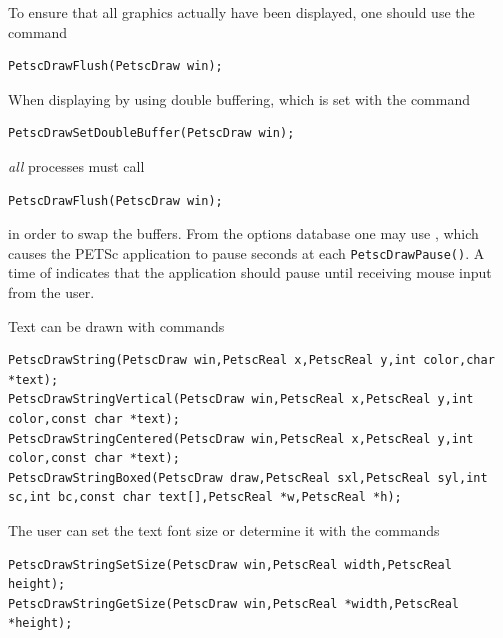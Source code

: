 {{{To ensure that all graphics actually have been displayed, one should use
 the
command
\begin{lstlisting}
PetscDrawFlush(PetscDraw win);
\end{lstlisting}
When displaying by using double buffering, which is set with the
command  
\begin{lstlisting}
PetscDrawSetDoubleBuffer(PetscDraw win);
\end{lstlisting}
{\em all} processes must call
\begin{lstlisting}
PetscDrawFlush(PetscDraw win);
\end{lstlisting}
in order to swap the buffers. From the options database one may use
 , which  causes the PETSc application
to pause  seconds at each \lstinline{PetscDrawPause()}. A time of 
indicates that the application should pause until receiving mouse
input from the user.

Text can be drawn with
commands 
\begin{lstlisting}
PetscDrawString(PetscDraw win,PetscReal x,PetscReal y,int color,char *text);
PetscDrawStringVertical(PetscDraw win,PetscReal x,PetscReal y,int color,const char *text);
PetscDrawStringCentered(PetscDraw win,PetscReal x,PetscReal y,int color,const char *text);
PetscDrawStringBoxed(PetscDraw draw,PetscReal sxl,PetscReal syl,int sc,int bc,const char text[],PetscReal *w,PetscReal *h);
\end{lstlisting}
The user can set the text font size or determine it with the
commands
\begin{lstlisting}
PetscDrawStringSetSize(PetscDraw win,PetscReal width,PetscReal height);
PetscDrawStringGetSize(PetscDraw win,PetscReal *width,PetscReal *height);
\end{lstlisting}

}}}
